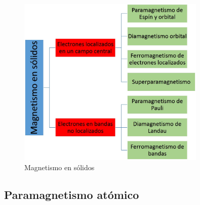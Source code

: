 \begin{figure}[H]
    \centering
    \includegraphics[width=0.8\textwidth]{./Figures/fig_s0}
	\caption{Magnetismo en sólidos}
	\label{fig:s0}
\end{figure}

\subsection{Paramagnetismo atómico}

